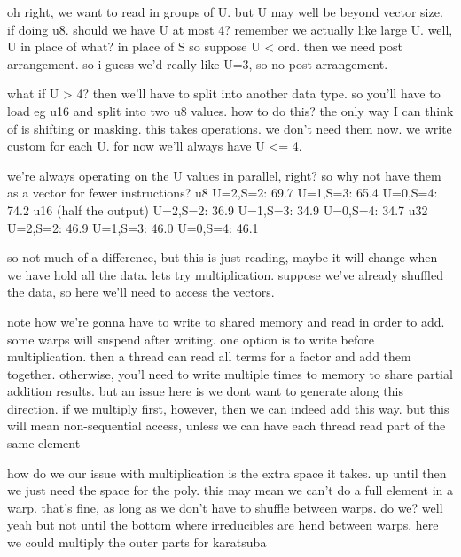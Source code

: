 oh right, we want to read in groups of U. but U may well be beyond vector size. 
if doing u8. should we have U at most 4? remember we actually like large U. well, U in place of what? in place of S 
so suppose U < ord. then we need post arrangement. so i guess we'd really like U=3, so no post arrangement.

what if U > 4?
then we'll have to split into another data type. so you'll have to load eg u16 and split into two u8 values. how to do this? the only way I can think of is shifting or masking. this takes operations. we don't need them now. we write custom for each U. for now we'll always have U <= 4.

we're always operating on the U values in parallel, right? so why not have them as a vector for fewer instructions?
u8
U=2,S=2: 69.7
U=1,S=3: 65.4
U=0,S=4: 74.2
u16 (half the output)
U=2,S=2: 36.9
U=1,S=3: 34.9
U=0,S=4: 34.7
u32
U=2,S=2: 46.9
U=1,S=3: 46.0
U=0,S=4: 46.1

so not much of a difference, but this is just reading, maybe it will change when we have hold all the data. 
lets try multiplication. suppose we've already shuffled the data, so 
here we'll need to access the vectors. 

note how we're gonna have to write to shared memory and read in order to add. some warps will suspend after writing.
one option is to write before multiplication. then a thread can read all terms for a factor and add them together.
otherwise, you'l need to write multiple times to memory to share partial addition results. but an issue here is we dont want to generate along this direction. 
if we multiply first, however, then we can indeed add this way. but this will mean non-sequential access, unless we can have each thread read part of the same element

how do we 
our issue with multiplication is the extra space it takes. up until then we just need the space for the poly. 
this may mean we can't do a full element in a warp. that's fine, as long as we don't have to shuffle between warps. do we? well yeah but not until the bottom where irreducibles are hend between warps. here we could multiply the outer parts for karatsuba

